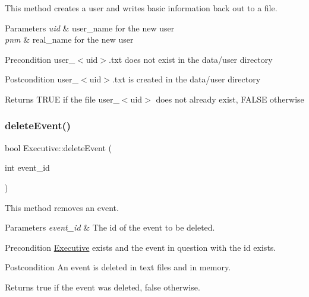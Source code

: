 This method creates a user and writes basic information back out to a file. 
\begin{DoxyParams}{Parameters}
{\em uid} & user\+\_\+name for the new user \\
\hline
{\em pnm} & real\+\_\+name for the new user \\
\hline
\end{DoxyParams}
\begin{DoxyPrecond}{Precondition}
user\+\_\+$<$uid$>$.\+txt does not exist in the data/user directory 
\end{DoxyPrecond}
\begin{DoxyPostcond}{Postcondition}
user\+\_\+$<$uid$>$.\+txt is created in the data/user directory 
\end{DoxyPostcond}
\begin{DoxyReturn}{Returns}
T\+R\+UE if the file user\+\_\+$<$uid$>$ does not already exist, F\+A\+L\+SE otherwise 
\end{DoxyReturn}
\mbox{\label{class_executive_a14c76414b43a4149728afc38613b8cee}} 
\subsubsection{\texorpdfstring{delete\+Event()}{deleteEvent()}}
{\footnotesize\ttfamily bool Executive\+::delete\+Event (\begin{DoxyParamCaption}\item[{int}]{event\+\_\+id }\end{DoxyParamCaption})}

This method removes an event. 
\begin{DoxyParams}{Parameters}
{\em event\+\_\+id} & The id of the event to be deleted. \\
\hline
\end{DoxyParams}
\begin{DoxyPrecond}{Precondition}
\mbox{\hyperlink{class_executive}{Executive}} exists and the event in question with the id exists. 
\end{DoxyPrecond}
\begin{DoxyPostcond}{Postcondition}
An event is deleted in text files and in memory. 
\end{DoxyPostcond}
\begin{DoxyReturn}{Returns}
true if the event was deleted, false otherwise. 
\end{DoxyReturn}
\mbox{\label{class_executive_aa2116b9668aa8fbae3be98ab35258db5}} 
